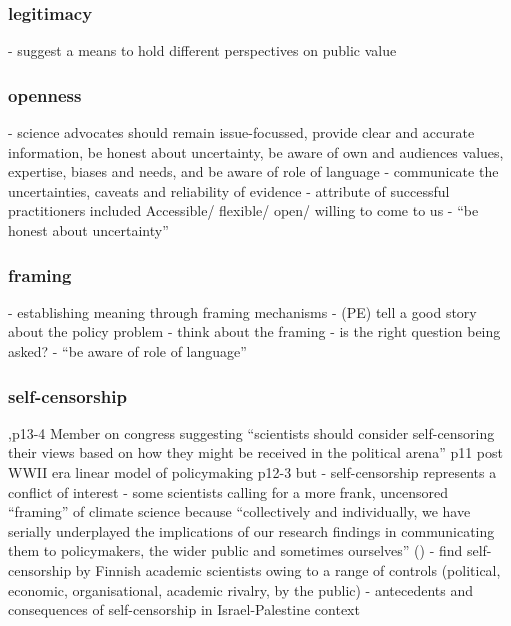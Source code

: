 \subsubsection{legitimacy}
\cite{GeuijenMCRv2017} - suggest a means to hold different perspectives on public value

\subsubsection{openness}
\cite{ElsensohnACDGGKPRS2019} - science advocates should remain issue-focussed, provide clear and accurate information, be honest about uncertainty, be aware of own and audiences values, expertise, biases and needs, and be aware of role of language
\cite{GluckmanBK2021} - communicate the uncertainties, caveats and reliability of evidence
\cite{GogginEtAl2015} - attribute of successful practitioners included Accessible/ flexible/ open/ willing to come to us
\cite{ElsensohnACDGGKPRS2019} - ``be honest about uncertainty''

\subsubsection{framing}
\cite{AukesLB2018} - establishing meaning through framing mechanisms
\cite{Cairney2018} - (PE) tell a good story about the policy problem
\cite{CairneyO2020}
\cite{GluckmanBK2021} - think about the framing - is the right question being asked?
\cite{ElsensohnACDGGKPRS2019} - ``be aware of role of language''

\subsubsection{self-censorship}
\cite{Pielke2007},p13-4 Member on congress suggesting ``scientists should consider self-censoring their views based on how they might be received in the political arena'' p11 post WWII era linear model of policymaking p12-3 but \cite{OjanenBKP2021} - self-censorship represents a conflict of interest
\cite{SimmsA2020,Carton2021,Bendell2024} - some scientists calling for a more frank, uncensored ``framing'' of climate science because ``collectively and individually, we have serially underplayed the implications of our research findings in communicating them to policymakers, the wider public and sometimes ourselves'' (\cite{CalverleyA2022})
\cite{ValiverronenS2021} - find self-censorship by Finnish academic scientists owing to a range of controls (political, economic, organisational, academic rivalry, by the public) 
\cite{BarTal2017} - antecedents and consequences of self-censorship in Israel-Palestine context

